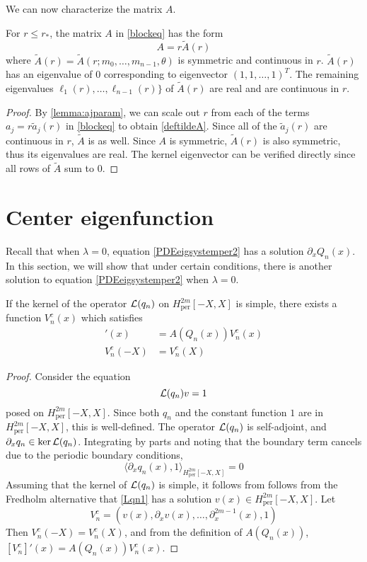 \documentclass[thesis.tex]{subfiles}
\begin{document}
We can now characterize the matrix $A$.

\begin{lemma}\label{lemma:tildeA}
For $r \leq r_*$, the matrix $A$ in \cref{blockeq} has the form
\begin{equation}\label{deftildeA}
A = r \tilde{A}(r)
\end{equation}
where $\tilde{A}(r) = \tilde{A}(r; m_0, \dots, m_{n-1}, \theta)$ is symmetric and continuous in $r$. $\tilde{A}(r)$ has an eigenvalue of 0 corresponding to eigenvector $(1, 1, \dots, 1)^T$. The remaining eigenvalues $\ell_1(r), \dots, \ell_{n-1}(r) \}$ of $\tilde{A}(r)$ are real and are continuous in $r$.
\begin{proof}
By \cref{lemma:ajparam}, we can scale out $r$ from each of the terms $a_j = r \tilde{a}_j(r)$ in \cref{blockeq} to obtain \cref{deftildeA}. Since all of the $\tilde{a}_j(r)$ are continuous in $r$, $\tilde{A}$ is as well. Since $A$ is symmetric, $\tilde{A}(r)$ is also symmetric, thus its eigenvalues are real. The kernel eigenvector can be verified directly since all rows of $\tilde{A}$ sum to 0.
\end{proof}
\end{lemma}

\section{Center eigenfunction}

Recall that when $\lambda = 0$, equation \cref{PDEeigsystemper2} has a solution $\partial_x Q_n(x)$. 
In this section, we will show that under certain conditions, there is another solution to equation \cref{PDEeigsystemper2} when $\lambda = 0$.

\begin{lemma}\label{lemma:centereigenfn1}
If the kernel of the operator $\mathcal{L}(q_n)$ on $H^{2m}_{\text{per}}[-X,X]$ is simple, there exists a function $V_n^c(x)$ which satisfies
\begin{align*}
[V_n^c]'(x) &= A(Q_n(x))V_n^c(x) \\
V_n^c(-X) &= V_n^c(X)
\end{align*}
\begin{proof}
Consider the equation
\begin{equation}\label{Lqn1}
\mathcal{L}(q_n) v = 1
\end{equation}
posed on $H^{2m}_{\text{per}}[-X,X]$. Since both $q_n$ and the constant function $1$ are in $H^{2m}_{\text{per}}[-X,X]$, this is well-defined. The operator $\mathcal{L}(q_n)$ is self-adjoint, and $\partial_x q_n \in \mathop\mathrm{ker}\nolimits \mathcal{L}(q_n)$. Integrating by parts and noting that the boundary term cancels due to the periodic boundary conditions,
\[
\langle \partial_x q_n(x), 1 \rangle_{H^{2m}_{\text{per}}[-X,X]} = 0
\]
Assuming that the kernel of $\mathcal{L}(q_n)$ is simple, it follows from follows from the Fredholm alternative that \cref{Lqn1} has a solution $v(x) \in {H^{2m}_{\text{per}}[-X,X]}$. Let
\[
V_n^c = \left( v(x), \partial_x v(x), \dots, \partial_x^{2m-1}(x), 1 \right)
\]
Then $V_n^c(-X) = V_n^c(X)$, and from the definition of $A(Q_n(x))$, $[V_n^c]'(x) = A(Q_n(x))V_n^c(x)$.
\end{proof}
\end{lemma}
\end{document}
